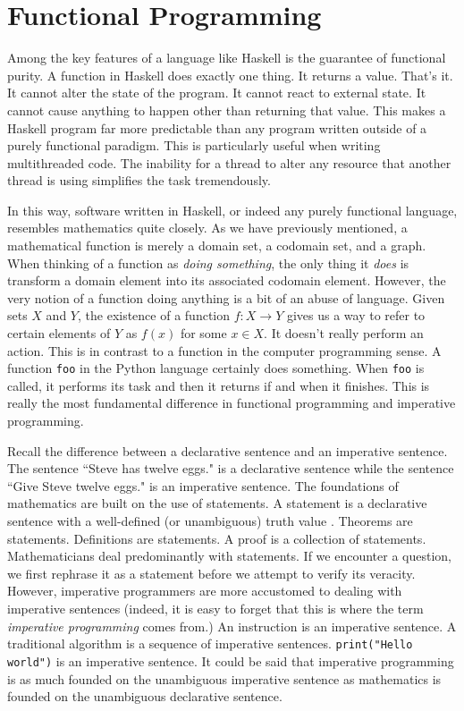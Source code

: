 \documentclass[MS, xcolor=dvipsnames]{wfuthesis}
\theoremstyle{definition}
\begin{document}

\chapter{Functional Programming}
Among the key features of a language like Haskell is the guarantee of functional purity. A function in Haskell does exactly one thing. It returns a value. That's it. It cannot alter the state of the program. It cannot react to external state. It cannot cause anything to happen other than returning that value. This makes a Haskell program far more predictable than any program written outside of a purely functional paradigm. This is particularly useful when writing multithreaded code. The inability for a thread to alter any resource that another thread is using simplifies the task tremendously. \par
In this way, software written in Haskell, or indeed any purely functional language, resembles mathematics quite closely. As we have previously mentioned, a mathematical function is merely a domain set, a codomain set, and a graph. When thinking of a function as \emph{doing something}, the only thing it \emph{does} is transform a domain element into its associated codomain element. However, the very notion of a function doing anything is a bit of an abuse of language. Given sets $X$ and $Y$, the existence of a function $f: X \to Y$ gives us a way to refer to certain elements of $Y$ as $f(x)$ for some $x \in X$. It doesn't really perform an action. This is in contrast to a function in the computer programming sense. A function \lstinline{foo} in the Python language certainly does something. When \lstinline{foo} is called, it performs its task and then it returns if and when it finishes. This is really the most fundamental difference in functional programming and imperative programming. \par
Recall the difference between a declarative sentence and an imperative sentence. The sentence ``Steve has twelve eggs." is a declarative sentence while the sentence ``Give Steve twelve eggs." is an imperative sentence. The foundations of mathematics are built on the use of statements. A statement is a declarative sentence with a well-defined (or unambiguous) truth value \cite{Bond1999}. Theorems are statements. Definitions are statements. A proof is a collection of statements. Mathematicians deal predominantly with statements. If we encounter a question, we first rephrase it as a statement before we attempt to verify its veracity. However, imperative programmers are more accustomed to dealing with imperative sentences (indeed, it is easy to forget that this is where the term \emph{imperative programming} comes from.) An instruction is an imperative sentence. A traditional algorithm is a sequence of imperative sentences. \lstinline{print("Hello world")} is an imperative sentence. It could be said that imperative programming is as much founded on the unambiguous imperative sentence as mathematics is founded on the unambiguous declarative sentence. \par
\end{document}
